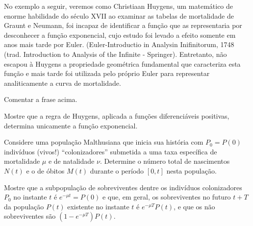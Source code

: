 No exemplo a seguir, veremos como Christiaan Huygens, um matemático de enorme habilidade do século XVII ao examinar as tabelas de mortalidade de Graunt e Neumann, foi incapaz de identificar a função que as representaria por desconhecer a função exponencial, cujo estudo foi levado a efeito somente em anos mais tarde por Euler. (Euler-Introductio in Analysin Inifinitorum, 1748 (trad. Introduction to Analysis of the Infinite - Springer). Entretanto, não escapou à Huygens a propriedade geométrica fundamental que caracteriza esta função e mais tarde foi utilizada pelo próprio Euler para representar analiticamente a curva de mortalidade.

\begin{exercise}
Comentar a frase acima.
\end{exercise}




\begin{exercise}
Mostre que a regra de Huygens, aplicada a funções diferenciáveis positivas, determina unicamente a função exponencial.
\end{exercise}





\begin{exercise}
Considere uma população Malthusiana que inicia sua história com \(P_0 = P(0)\) indivíduos (vivos!) ``colonizadores'' submetida a uma taxa específica de mortalidade \(\mu\) e de natalidade \(\nu\). Determine o número total de nascimentos \(N(t)\) e o de óbitos \(M(t)\) durante o período \([0,t]\) nesta população.
\end{exercise}

\begin{exercise}
Mostre que a subpopulação de sobreviventes dentre os indivíduos colonizadores \(P_0\) no instante \(t\) é \(e^{-\mu t} = P(0)\) e que, em geral, os sobreviventes no futuro \(t+T\) da população \(P(t)\) existente no instante \(t\) é \(e^{-\mu T} P(t)\), e que os não sobreviventes são \((1-e^{-\mu T}) P(t)\).
\end{exercise}




